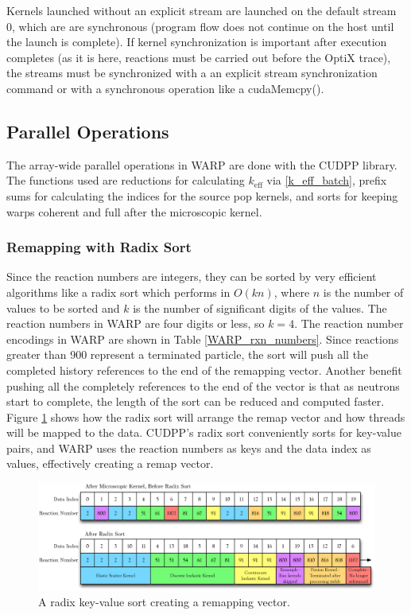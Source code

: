 Kernels launched without an explicit stream are launched on the default stream 0, which are are synchronous (program flow does not continue on the host until the launch is complete).  If kernel synchronization is important after execution completes (as it is here, reactions must be carried out before the OptiX trace), the streams must be synchronized with a an explicit stream synchronization command or with a synchronous operation like a cudaMemcpy().

\subsection{Parallel Operations}

The array-wide parallel operations in WARP are done with the CUDPP library.  The functions used are reductions for calculating $k_\mathrm{eff}$ via \eqref{k_eff_batch}, prefix sums for calculating the indices for the source pop kernels, and sorts for keeping warps coherent and full after the microscopic kernel.

\subsubsection{Remapping with Radix Sort}

Since the reaction numbers are integers, they can be sorted by very efficient algorithms like a radix sort which performs in $O(kn)$, where $n$ is the number of values to be sorted and $k$ is the number of significant digits of the values.  The reaction numbers in WARP are four digits or less, so $k=4$.  The reaction number encodings in WARP are shown in Table \ref{WARP_rxn_numbers}.  Since reactions greater than 900 represent a terminated particle, the sort will push all the completed history references to the end of the remapping vector.  Another benefit pushing all the completely references to the end of the vector is that as neutrons start to complete, the length of the sort can be reduced and computed faster.  Figure \ref{radix_sort} shows how the radix sort will arrange the remap vector and how threads will be mapped to the data.  CUDPP's radix sort conveniently sorts for key-value pairs, and WARP uses the reaction numbers as keys and the data index as values, effectively creating a remap vector.

\begin{figure}[h!] 
\centering
\includegraphics[width=1.0\textwidth]{graphics/radix_horiz.eps}
\caption{A radix key-value sort creating a remapping vector. \label{radix_sort} }
\end{figure}

